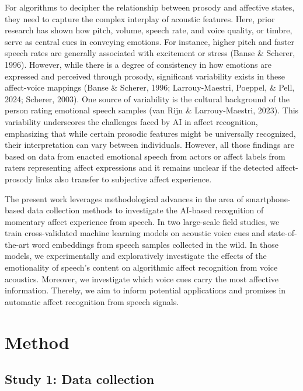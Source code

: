 \documentclass[
  english,
  man,floatsintext]{apa6}
\begin{document}
For algorithms to decipher the relationship between prosody and affective states, they need to capture the complex interplay of acoustic features. Here, prior research has shown how pitch, volume, speech rate, and voice quality, or timbre, serve as central cues in conveying emotions. For instance, higher pitch and faster speech rates are generally associated with excitement or stress (Banse \& Scherer, 1996). However, while there is a degree of consistency in how emotions are expressed and perceived through prosody, significant variability exists in these affect-voice mappings (Banse \& Scherer, 1996; Larrouy-Maestri, Poeppel, \& Pell, 2024; Scherer, 2003). One source of variability is the cultural background of the person rating emotional speech samples (van Rijn \& Larrouy-Maestri, 2023). This variability underscores the challenges faced by AI in affect recognition, emphasizing that while certain prosodic features might be universally recognized, their interpretation can vary between individuals. However, all those findings are based on data from enacted emotional speech from actors or affect labels from raters representing affect expressions and it remains unclear if the detected affect-prosody links also transfer to subjective affect experience.

The present work leverages methodological advances in the area of smartphone-based data collection methods to investigate the AI-based recognition of momentary affect experience from speech. In two large-scale field studies, we train cross-validated machine learning models on acoustic voice cues and state-of-the-art word embeddings from speech samples collected in the wild. In those models, we experimentally and exploratively investigate the effects of the emotionality of speech's content on algorithmic affect recognition from voice acoustics. Moreover, we investigate which voice cues carry the most affective information. Thereby, we aim to inform potential applications and promises in automatic affect recognition from speech signals.

\hypertarget{method}{%
\section{Method}\label{method}}

\hypertarget{study-1-data-collection}{%
\subsection{Study 1: Data collection}\label{study-1-data-collection}}
\end{document}
